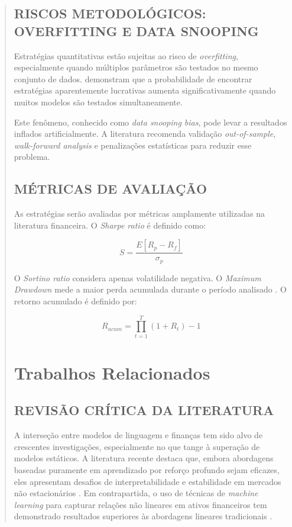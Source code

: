 \documentclass{eic-bcc-tcc}
\begin{document}
\begin{abstract}
\section{RISCOS METODOLÓGICOS: OVERFITTING E DATA SNOOPING}

Estratégias quantitativas estão sujeitas ao risco de \textit{overfitting}, especialmente quando múltiplos parâmetros são testados no mesmo conjunto de dados. \citep{Bailey2014} demonstram que a probabilidade de encontrar estratégias aparentemente lucrativas aumenta significativamente quando muitos modelos são testados simultaneamente.

Este fenômeno, conhecido como \textit{data snooping bias}, pode levar a resultados inflados artificialmente. A literatura recomenda validação \textit{out-of-sample}, \textit{walk-forward analysis} e penalizações estatísticas para reduzir esse problema.

\section{MÉTRICAS DE AVALIAÇÃO}

As estratégias serão avaliadas por métricas amplamente utilizadas na literatura financeira. O \textit{Sharpe ratio} \citep{Sharpe1966} é definido como:

\begin{equation}
S = \frac{E[R_p - R_f]}{\sigma_p}
\end{equation}

O \textit{Sortino ratio} \citep{Sortino1994} considera apenas volatilidade negativa. O \textit{Maximum Drawdown} mede a maior perda acumulada durante o período analisado \citep{Magdon2004}. O retorno acumulado é definido por:

\begin{equation}
R_{acum} = \prod_{t=1}^{T} (1 + R_t) - 1
\end{equation}


\chapter{Trabalhos Relacionados}
\label{cha:relacionados}

\section{REVISÃO CRÍTICA DA LITERATURA}

A interseção entre modelos de linguagem e finanças tem sido alvo de crescentes investigações, especialmente no que tange à superação de modelos estáticos. A literatura recente destaca que, embora abordagens baseadas puramente em aprendizado por reforço profundo sejam eficazes, eles apresentam desafios de interpretabilidade e estabilidade em mercados não estacionários \citep{Jiang2017}. Em contrapartida, o uso de técnicas de \textit{machine learning} para capturar relações não lineares em ativos financeiros tem demonstrado resultados superiores às abordagens lineares tradicionais \citep{Gu2020}.


\end{abstract}
\end{document}
